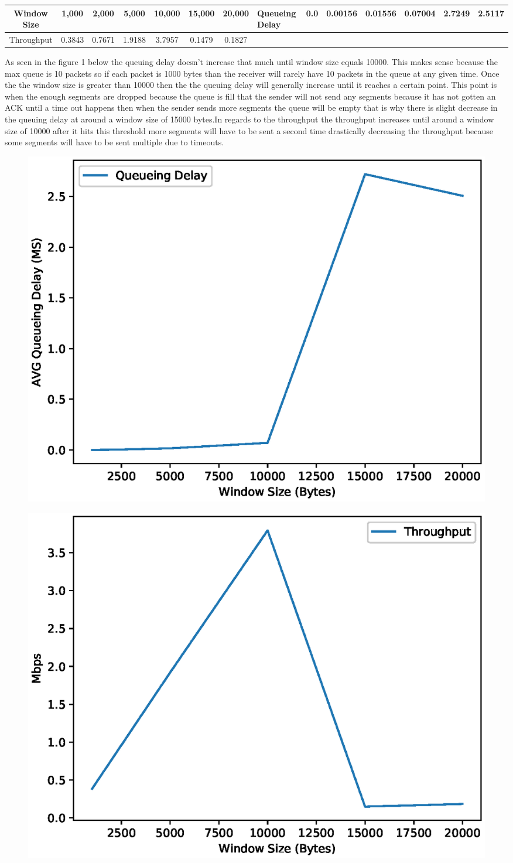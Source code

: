 \documentclass{article}
\begin{document}
\begin{center}
 \begin{tabular}{|c | c c c c c c|} 
 \hline
 Window Size & 1,000 &
    2,000 & 5,000 & 10,000 & 15,000 & 20,000 &
 \hline
 Queueing Delay & 0.0 & 0.00156 & 0.01556 & 0.07004 & 2.7249 & 2.5117 \\ 
 \hline
 Throughput & 0.3843 & 0.7671 & 1.9188 & 3.7957 &  0.1479 & 0.1827  \\
 \hline
\end{tabular}
\end{center}



As seen in the figure 1 below the queuing delay doesn't increase that much until window size equals 10000.
This makes sense because the max queue is 10 packets so if each packet is 1000 bytes than the receiver will rarely have 10 packets in the queue at any given time.
Once the the window size is greater than 10000 then the the queuing delay will generally increase until it reaches a certain point.
This point is when the enough segments are dropped because the queue is fill that the sender will not send any segments because it has not gotten an ACK until a time out happens then when the sender sends more segments the queue will be empty that is why there is slight decrease in the queuing delay at around a window size of 15000 bytes.In regards to the throughput the throughput increases until around a window size of 10000 after it hits this threshold more segments will have to be sent a second time drastically decreasing the throughput because some segments will have to be sent multiple due to timeouts.

\begin{figure}
  \centering
  \includegraphics[width=.6\textwidth] {delay.eps}
\end{figure}

\begin{figure}
    \centering
  \includegraphics[width=.6\textwidth]{throughput.eps}
\end{figure}
\end{document}
